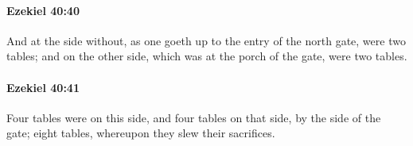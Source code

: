 		\paragraph{Ezekiel 40:40} %
			\label{EZEKIEL-40-40}

			And at the side without, as one goeth up to the entry of the north gate, were two tables; and on the other side, which was at the porch of the gate, were two tables.


		\paragraph{Ezekiel 40:41} %
			\label{EZEKIEL-40-41}

			Four tables were on this side, and four tables on that side, by the side of the gate; eight tables, whereupon they slew their sacrifices.


